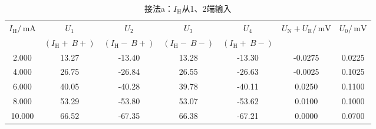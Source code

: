 \documentclass[a4paper,fontset=windows]{ctexart}
\begin{document}
    \vspace{0.5em}
        \begin{table}[ht!]\large
            \begin{center}
            \caption*{\large 接法a：$I_\mathrm{H}$从1、2端输入}
                \begin{tabular}{ |c|c|c|c|c|c|c| }
                    \hline
                    \multirow{2}{*}{$I_\mathrm{H}/\,\mathrm{mA}$} & $U_1$ & $U_2$ & $U_3$ & $U_4$ & \multirow{2}{*}{$U_\mathrm{N} + U_\mathrm{R}/\,\mathrm{mV}$} & \multirow{2}{*}{$U_0/\,\mathrm{mV}$} \\
                    & $(I_\mathrm{H}+\ B+)$ & $(I_\mathrm{H}-\ B+)$ & $(I_\mathrm{H}-\ B-)$ & $(I_\mathrm{H}+\ B-)$ & & \\
                    \hline
                    2.000 & 13.27 & -13.40 & 13.28 & -13.30 & -0.0275 & 0.0225 \\
                    \hline
                    4.000 & 26.75 & -26.84 & 26.55 & -26.63 & -0.0025 & 0.1025 \\
                    \hline
                    6.000 & 40.05 & -40.28 & 39.78 & -40.11 & 0.0250 & 0.1100 \\
                    \hline
                    8.000 & 53.29 & -53.80 & 53.07 & -53.62 & 0.0100 & 0.1000 \\
                    \hline
                    10.000 & 66.52 & -67.35 & 66.38 & -67.21 & 0.0000 & 0.0700 \\
                    \hline
                \end{tabular}
            \end{center}
        \end{table}
    \vspace{-0.5em}
\end{document}
